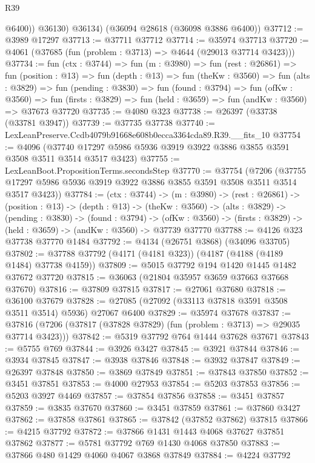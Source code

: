 \begin{lexlean}{R39}
\begin{coremodule}
            @6400))
        @36130)
      @36134)
    (@36094 @28618 (@36098 @3886 @6400))
@37712 := @3989 @17297
@37713 := @37711 @37712
@37714 := @35974 @37713
@37720 := @4061 (@37685 (fun (problem : @3713) => @4644 (@29013 @37714 @3423)))
@37734 := fun (ctx : @3744) =>
  fun (m : @3980) =>
  fun (rest : @26861) =>
  fun (position : @13) =>
  fun (depth : @13) =>
  fun (theKw : @3560) =>
  fun (alts : @3829) =>
  fun (pending : @3830) =>
  fun (found : @3794) =>
  fun (ofKw : @3560) =>
  fun (firsts : @3829) => fun (held : @3659) => fun (andKw : @3560) => @37673 @37720
@37735 := @4080 @323
@37738 := @26397 (@33738 (@33781 @3947))
@37739 := @37735 @37738
@37740 := LexLeanPreserve.Ccdb4079b91668e608b0ecca3364cda89.R39.__fits_10
@37754 := @4096
    (@37740 @17297 @5986 @5936 @3919 @3922 @3886 @3855 @3591 @3508 @3511 @3514 @3517 @3423)
@37755 := LexLeanBoot.PropositionTerms.secondsStep
@37770 := @37754
    (@7206 (@37755 @17297 @5986 @5936 @3919 @3922 @3886 @3855 @3591 @3508 @3511 @3514 @3517 @3423))
@37784 := (ctx : @3744) ->
  (m : @3980) ->
  (rest : @26861) ->
  (position : @13) ->
  (depth : @13) ->
  (theKw : @3560) ->
  (alts : @3829) ->
  (pending : @3830) ->
  (found : @3794) ->
  (ofKw : @3560) -> (firsts : @3829) -> (held : @3659) -> (andKw : @3560) -> @37739 @37770
@37788 := @4126 @323 @37738 @37770 @1484
@37792 := @4134 (@26751 @3868) (@34096 @33705)
@37802 := @37788 @37792 (@4171 (@4181 @323)) (@4187 (@4188 (@4189 @1484) @37738 @4159))
@37809 := @5015 @37792 @194 @1420 @1445 @1482 @37672 @37720
@37815 := @36063 (@21804 @35957 @3659 @37663 @37668 @37670)
@37816 := @37809 @37815
@37817 := @27061 @37680
@37818 := @36100 @37679
@37828 := @27085 (@27092 (@33113 @37818 @3591 @3508 @3511 @3514) @5936) @27067 @6400
@37829 := @35974 @37678
@37837 := @37816 (@7206 (@37817 (@37828 @37829) (fun (problem : @3713) => @29035 @37714 @3423)))
@37842 := @5319 @37792 @764 @1444 @37628 @37671
@37843 := @5755 @769
@37844 := @3926 @3427
@37845 := @3921 @37844
@37846 := @3934 @37845
@37847 := @3938 @37846
@37848 := @3932 @37847
@37849 := @26397 @37848
@37850 := @3869 @37849
@37851 := @37843 @37850
@37852 := @3451 @37851
@37853 := @4000 @27953
@37854 := @5203 @37853
@37856 := @5203 @3927 @4469
@37857 := @37854 @37856
@37858 := @3451 @37857
@37859 := @3835 @37670
@37860 := @3451 @37859
@37861 := @37860 @3427
@37862 := @37858 @37861
@37865 := @37842 (@37852 @37862) @37815
@37866 := @4215 @37792
@37872 := @37866 @1431 @1443 @4068 @37627 @37851 @37862
@37877 := @5781 @37792 @769 @1430 @4068 @37850
@37883 := @37866 @480 @1429 @4060 @4067 @3868 @37849
@37884 := @4224 @37792

\end{coremodule}
\end{lexlean}

